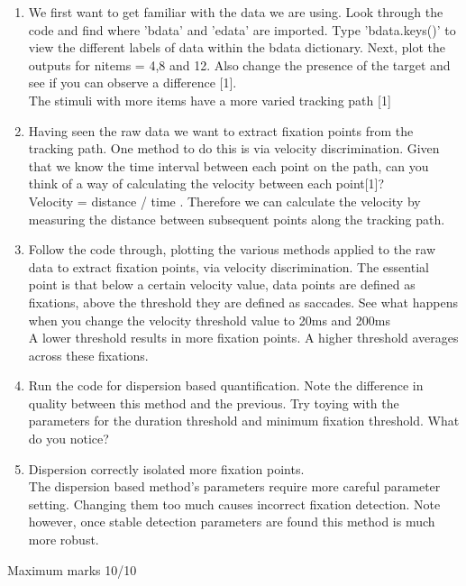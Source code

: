 \documentclass[12pt,english]{scrartcl}
\begin{document}
\begin{enumerate}
\item We first want to get familiar with the data we are using. Look through the code and find where 'bdata' and 'edata' are imported. Type 'bdata.keys()' to view the different labels of data within the bdata dictionary. Next, plot the outputs for nitems = 4,8 and 12. Also change the presence of the target and see if you can observe a difference [1]. \\

 \color{blue}
 The stimuli with more items have a more varied tracking path [1] 
 
 \color{black}
 \item Having seen the raw data we want to extract fixation points from the tracking path. One method to do this is via velocity discrimination. Given that we know the time interval between each point on the path, can you think of a way of calculating the velocity between each point[1]? \\
 
 \color{blue}
 Velocity = distance / time . Therefore we can calculate the velocity by measuring the distance between subsequent points along the tracking path. \\
 
 \color{black}
 \item Follow the code through, plotting the various methods applied to the raw data to extract fixation points, via velocity discrimination. The essential point is that below a certain velocity value, data points are defined as fixations, above the threshold they are defined as saccades. See what happens when you change the velocity threshold value to 20ms and 200ms\\
 
 \color{blue}
 A lower threshold results in more fixation points. A higher threshold averages across these fixations. \\
 
 \color{black}
 \item Run the code for dispersion based quantification. Note the difference in quality between this method and the previous. Try toying with the parameters for the duration threshold and minimum fixation threshold. What do you notice? \\
 \item[]
 \color{blue}
 Dispersion correctly isolated more fixation points. \\
 
 The dispersion based method's parameters require more careful parameter setting. Changing them too much causes incorrect fixation detection. Note however, once stable detection parameters are found this method is much more robust.
  

 \end{enumerate}
 \color{black}
 Maximum marks 10/10 \\
\end{document}
